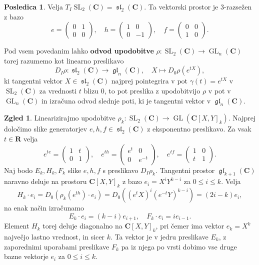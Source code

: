 \documentclass[11pt]{book}
\def\RR{\mathbf{R}}
\def\CC{\mathbf{C}}
\DeclareMathOperator\GL{GL}
\DeclareMathOperator\glfrak{\mathfrak{gl}}
\DeclareMathOperator\slfrak{\mathfrak{sl}}
\DeclareMathOperator\SL{SL}
\def\definicija{\color{rdeca}\bf}
\theoremstyle{definition}
\theoremstyle{zgled}
\newtheorem{zgled}[theorem]{Zgled}
\theoremstyle{zgledbrezstevilke}
\theoremstyle{odprtproblem}
\theoremstyle{domacanaloga}
\theoremstyle{izrek}
\newtheorem{posledica}[theorem]{Posledica}
\begin{document}
\begin{posledica}
Velja $T_I \SL_2(\CC) = \slfrak_2(\CC)$. Ta vektorski prostor je $3$-razsežen z bazo
\[
    e = \begin{pmatrix}
        0 & 1 \\ 0 & 0
    \end{pmatrix},
    \quad
    h = \begin{pmatrix}
        1 & 0 \\ 0 & -1
    \end{pmatrix},
    \quad
    f = \begin{pmatrix}
        0 & 0 \\ 1 & 0
    \end{pmatrix}.
\]
\end{posledica}

Pod vsem povedanim lahko {\definicija odvod upodobitve} $\rho \colon \SL_2(\CC) \to \GL_n(\CC)$ torej razumemo kot linearno preslikavo
\[
    {\textstyle D_I \rho \colon \slfrak_2(\CC) \to \glfrak_n(\CC),} \quad
    X \mapsto D_0 \rho(e^{tX}),
\]
ki tangentni vektor $X \in \slfrak_2(\CC)$ najprej pointegrira v pot $\gamma(t) = e^{tX}$ v $\SL_2(\CC)$ za vrednosti $t$ blizu $0$, to pot preslika z upodobitvijo $\rho$ v pot v $\GL_n(\CC)$ in izračuna odvod slednje poti, ki je tangentni vektor v $\glfrak_n(\CC)$.

\begin{zgled}
Linearizirajmo upodobitve $\rho_k \colon \SL_2(\CC) \to \GL(\CC[X,Y]_k)$. Najprej določimo slike generatorjev $e,h,f \in \slfrak_2(\CC)$ z eksponentno preslikavo. Za vsak $t \in \RR$ velja
\[
    e^{te} = \begin{pmatrix}
        1 & t \\ 0 & 1
    \end{pmatrix}, \quad
    e^{th} = \begin{pmatrix}
        e^t & 0 \\ 0 & e^{-t}
    \end{pmatrix}, \quad
    e^{tf} = \begin{pmatrix}
        1 & 0 \\ t & 1
    \end{pmatrix}.
\]
Naj bodo $E_k, H_k, F_k$ slike $e,h,f$ s preslikavo $D_I \rho_k$. Tangentni prostor $\glfrak_{k+1}(\CC)$ naravno deluje na prostoru $\CC[X,Y]_k$ z bazo $e_i = X^i Y^{k-i}$ za $0 \leq i \leq k$. Velja
\[
    H_k \cdot e_i
    = D_0 \left( \rho_k(e^{th}) \cdot e_i \right)
    = D_0 \left( (e^t X)^i (e^{-t} Y)^{k-i} \right)
    = (2i - k) e_i,
\]
na enak način izračunamo
\[
    E_k \cdot e_i = (k-i) e_{i+1}, \quad
    F_k \cdot e_i = i e_{i-1}.
\]
Element $H_k$ torej deluje diagonalno na $\CC[X,Y]_k$, pri čemer ima vektor $e_k = X^k$ največjo lastno vrednost, in sicer $k$. Ta vektor je v jedru preslikave $E_k$, z zaporednimi uporabami preslikave $F_k$ pa iz njega po vrsti dobimo vse druge bazne vektorje $e_i$ za $0 \leq i \leq k$.
\end{zgled}
\end{document}
